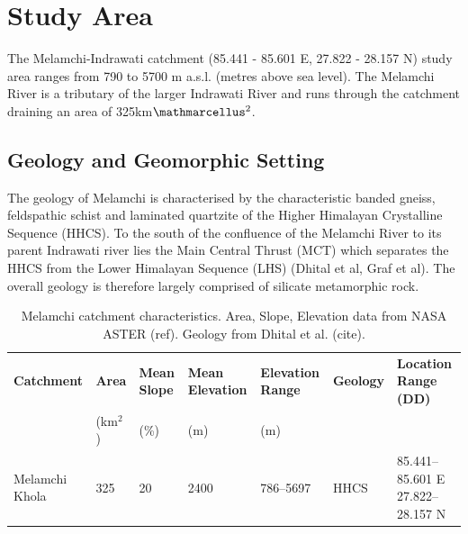 
\section{Study Area}



The Melamchi-Indrawati catchment (85.441 - 85.601 E, 27.822 - 28.157 N) study area ranges from 790 to 5700 m a.s.l. (metres above sea level). The Melamchi River is a tributary of the larger Indrawati River and runs through the catchment draining an area of 325km$\ttmath{^2}$. 

\subsection{Geology and Geomorphic Setting}


The geology of Melamchi is characterised by the characteristic banded gneiss, feldspathic schist and laminated quartzite of the Higher Himalayan Crystalline Sequence (HHCS). To the south of the confluence of the Melamchi River to its parent Indrawati river lies the Main Central Thrust (MCT) which separates the HHCS from the Lower Himalayan Sequence (LHS) (Dhital et al, Graf et al). The overall geology is therefore largely comprised of silicate metamorphic rock.


\begin{table}[h!]
    \centering
    \begin{small}
    \begin{tabular}{p{3cm} p{1cm} p{1cm} p{1.8cm} p{1.9cm} p{1.5cm} p{3cm}}
           \hline
           \textbf{Catchment} & \textbf{Area} & \textbf{Mean Slope} & \textbf{Mean Elevation} & \textbf{Elevation Range} & \textbf{Geology} & \textbf{Location Range (DD)} \\[4pt]
                              & (km$^2$)    & (\%)                & (m)                     & (m)                      &                &  \\[4pt]
           \hline
           Melamchi Khola     & 325         & 20                  & 2400                    & 786--5697                & HHCS           & 85.441--85.601 E  27.822--28.157 N \\[4pt]
           \hline
    \end{tabular}
    \end{small}
    \caption{Melamchi catchment characteristics. Area, Slope, Elevation data from NASA ASTER (ref). Geology from Dhital et al. (cite).}
    \label{tab:catchment_characteristics}
    \end{table}
    


